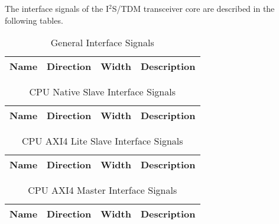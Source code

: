 \label{sec:is}

The interface signals of the I$^{2}$S/TDM transceiver core are described in the following tables.

\begin{table}[H]
  \centering
  \begin{tabular}{|l|l|r|p{10.5cm}|}
    
    \hline
    \rowcolor{iob-green}
    {\bf Name} & {\bf Direction} & {\bf Width} & {\bf Description}  \\ \hline \hline

    
 
  \end{tabular}
  \caption{General Interface Signals}
  \label{gen_is_tab:is}
\end{table}

\begin{table}[H]
  \centering
  \begin{tabular}{|l|l|r|p{10.5cm}|}
    
    \hline
    \rowcolor{iob-green}
    {\bf Name} & {\bf Direction} & {\bf Width} & {\bf Description}  \\ \hline \hline

    
 
  \end{tabular}
  \caption{CPU Native Slave Interface Signals}
  \label{cpu_nat_s_is_tab:is}
\end{table}
\clearpage

\begin{table}[H]
  \centering
  \begin{tabular}{|l|l|r|p{9.5cm}|}
    
    \hline
    \rowcolor{iob-green}
    {\bf Name} & {\bf Direction} & {\bf Width} & {\bf Description}  \\ \hline \hline

    
 
  \end{tabular}
  \caption{CPU AXI4 Lite Slave Interface Signals}
  \label{cpu_axi4lite_s_is_tab:is}
\end{table}

\begin{table}[H]
  \centering
  \begin{tabular}{|l|l|r|p{8.5cm}|}
    
    \hline
    \rowcolor{iob-green}
    {\bf Name} & {\bf Direction} & {\bf Width} & {\bf Description}  \\ \hline \hline

    
 
  \end{tabular}
  \caption{CPU AXI4 Master Interface Signals}
  \label{cpu_axi4_m_is_tab:is}
\end{table}


